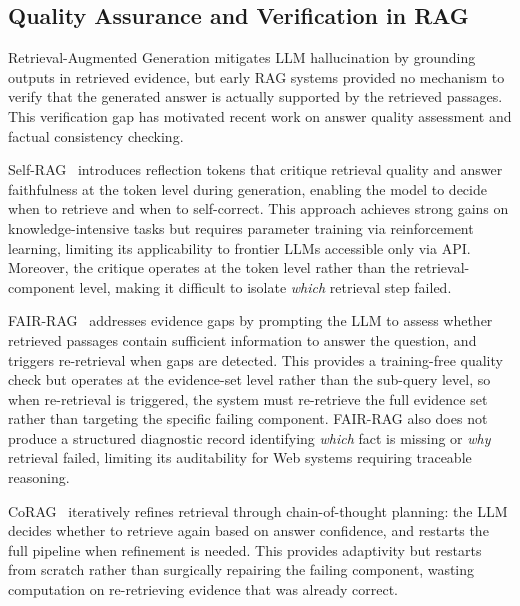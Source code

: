 
\subsection{Quality Assurance and Verification in RAG}

Retrieval-Augmented Generation mitigates LLM hallucination by grounding outputs
in retrieved evidence, but early RAG systems provided no mechanism to verify
that the generated answer is actually supported by the retrieved passages. This
verification gap has motivated recent work on answer quality assessment and
factual consistency checking.

Self-RAG~\cite{asai2023selfrag} introduces reflection tokens that critique
retrieval quality and answer faithfulness at the token level during generation,
enabling the model to decide when to retrieve and when to self-correct. This
approach achieves strong gains on knowledge-intensive tasks but requires
parameter training via reinforcement learning, limiting its applicability to
frontier LLMs accessible only via API. Moreover, the critique operates at the
token level rather than the retrieval-component level, making it difficult to
isolate \emph{which} retrieval step failed.

FAIR-RAG~\cite{fairrag2025} addresses evidence gaps by prompting the LLM to
assess whether retrieved passages contain sufficient information to answer the
question, and triggers re-retrieval when gaps are detected. This provides a
training-free quality check but operates at the evidence-set level rather than
the sub-query level, so when re-retrieval is triggered, the system must
re-retrieve the full evidence set rather than targeting the specific failing
component. FAIR-RAG also does not produce a structured diagnostic record
identifying \emph{which} fact is missing or \emph{why} retrieval failed, limiting
its auditability for Web systems requiring traceable reasoning.

CoRAG~\cite{lyu2025corag} iteratively refines retrieval through chain-of-thought
planning: the LLM decides whether to retrieve again based on answer confidence,
and restarts the full pipeline when refinement is needed. This provides
adaptivity but restarts from scratch rather than surgically repairing the failing
component, wasting computation on re-retrieving evidence that was already correct.

